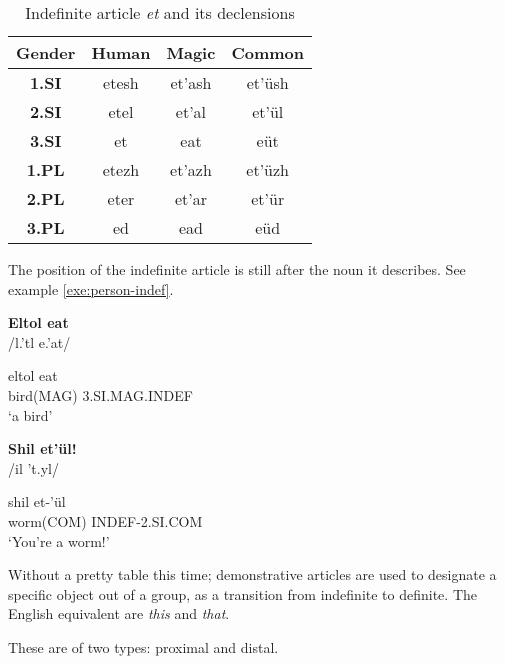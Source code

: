 \begin{table}[h]
\begin{center}\label{tab:morph-indef-pers-suff}
\begin{tabular}{|c||c|c|c|}
\hline
\textbf{Gender} & \textbf{Human} & \textbf{Magic} & \textbf{Common}\\\hline
\textbf{1.SI}                    & etesh & et’ash & et’üsh \\\hline
\textbf{2.SI}                    & etel  & et’al  & et’ül  \\\hline
\textbf{3.SI}                    & et    & eat    & eüt    \\\hline
\textbf{1.PL}                    & etezh & et’azh & et’üzh \\\hline
\textbf{2.PL}                    & eter  & et’ar  & et’ür  \\\hline
\textbf{3.PL}                    & ed    & ead    & eüd    \\\hline
\end{tabular}
\end{center}
\caption{Indefinite article \emph{et} and its declensions}
\end{table}

The position of the indefinite article is still after the noun it describes. See example
\ref{exe:person-indef}.

\begin{exe}
\ex\label{exe:person-indef}
\begin{xlist}
\ex\textbf{Eltol eat}\\
/{\ipaE}l.'t{\ipaO}l e.'at/

\gll \gls{eltol} eat\\
bird(MAG) 3.SI.MAG.INDEF\\
\trans ‘a bird’

\ex\textbf{Shil et’ül!}\\
/{\ipaS}il '{\ipaE}t.yl/

\gll {}\gls{shil} et-’ül\\
worm(COM) INDEF-2.SI.COM\\
\trans ‘You’re a worm!’
\end{xlist}
\end{exe}

Without a pretty table this time; demonstrative articles are used to designate a specific object out
of a group, as a transition from indefinite to definite. The English equivalent are \emph{this} and
\emph{that}.

These are of two types: proximal and distal.

